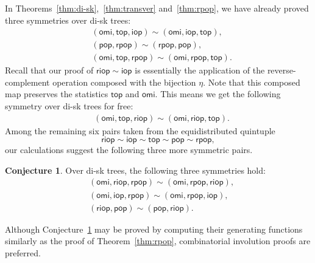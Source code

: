 \documentclass[12pt]{amsart}
\numberwithin{equation}{section}
\theoremstyle{plain}
\theoremstyle{definition}
\newtheorem{conj}[theorem]{Conjecture}
\def\iop{\mathsf{iop}}
\def\top{\mathsf{top}}
\def\riop{\mathsf{riop}}
\def\pop{\mathsf{pop}}
\def\rpop{\mathsf{rpop}}
\def\omi{\mathsf{omi}}
\begin{document}
In Theorems~\ref{thm:di-sk},~\ref{thm:transver} and~\ref{thm:rpop}, we have already proved three symmetries over di-sk trees: 
\begin{align*}
&(\omi,\top,\iop)\sim(\omi,\iop,\top),\\
&(\pop,\rpop)\sim(\rpop,\pop),\\
& (\omi,\top,\rpop)\sim(\omi,\rpop,\top).
\end{align*}
Recall that our proof of $\riop\sim\iop$ is essentially the application of the reverse-complement operation composed with the bijection $\eta$. Note that this composed map preserves the statistics $\top$ and $\omi$. This means we get the following symmetry over di-sk trees for free:
\begin{align*}
&(\omi,\top,\riop)\sim(\omi,\riop,\top).
\end{align*} 
Among the remaining six pairs taken from the equidistributed quintuple $$\riop\sim\iop\sim\top\sim\pop\sim\rpop,$$ our calculations suggest the following three more symmetric pairs. 
\begin{conj}\label{conj:sym}
Over di-sk trees, the following three symmetries hold:
\begin{align*}
&(\omi,\riop,\rpop)\sim(\omi,\rpop,\riop),\\
&(\omi,\iop,\rpop)\sim(\omi,\rpop,\iop),\\
& (\riop,\pop)\sim(\pop,\riop).
\end{align*}
\end{conj}
Although Conjecture~\ref{conj:sym} may be proved by computing their generating functions similarly as the proof of Theorem~\ref{thm:rpop},  combinatorial involution proofs are preferred. 
\end{document}

